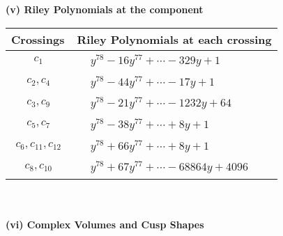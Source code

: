 \documentclass[1p]{elsarticle_modified}
\theoremstyle{definition}
\begin{document}
\newpage\renewcommand{\arraystretch}{1}
\flushleft \textbf{(v) Riley Polynomials at the component}\newline \\
\begin{tabular}{m{50pt}|m{274pt}}
Crossings & \hspace{64pt}Riley Polynomials at each crossing \\
\hline $$\begin{aligned}c_{1}\end{aligned}$$&$\begin{aligned}
&y^{78}-16 y^{77}+\cdots-329 y+1
\end{aligned}$\\
\hline $$\begin{aligned}c_{2},c_{4}\end{aligned}$$&$\begin{aligned}
&y^{78}-44 y^{77}+\cdots-17 y+1
\end{aligned}$\\
\hline $$\begin{aligned}c_{3},c_{9}\end{aligned}$$&$\begin{aligned}
&y^{78}-21 y^{77}+\cdots-1232 y+64
\end{aligned}$\\
\hline $$\begin{aligned}c_{5},c_{7}\end{aligned}$$&$\begin{aligned}
&y^{78}-38 y^{77}+\cdots+8 y+1
\end{aligned}$\\
\hline $$\begin{aligned}c_{6},c_{11},c_{12}\end{aligned}$$&$\begin{aligned}
&y^{78}+66 y^{77}+\cdots+8 y+1
\end{aligned}$\\
\hline $$\begin{aligned}c_{8},c_{10}\end{aligned}$$&$\begin{aligned}
&y^{78}+67 y^{77}+\cdots-68864 y+4096
\end{aligned}$\\
\hline
\end{tabular}\\~\\
\newpage\flushleft \textbf{(vi) Complex Volumes and Cusp Shapes}
\end{document}

